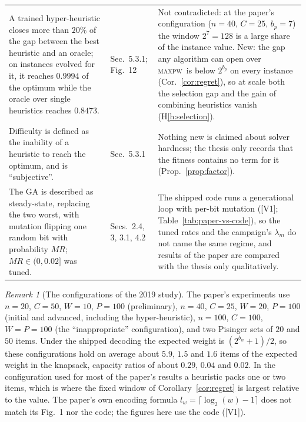 \documentclass[a4paper,11pt]{article}
\newcommand{\bw}{b_{w}}
\newcommand{\bp}{b_{p}}
\newcommand{\MAXPW}{\textsc{maxpw}}
\newcommand{\evid}[1]{\textcolor{inkSoft}{\scriptsize[#1]}}
\theoremstyle{plain}
\theoremstyle{definition}
\theoremstyle{remark}
\newtheorem{remark}{Remark}
\begin{document}
\begin{center}
\begin{longtable}{@{}p{5.3cm}p{1.5cm}p{7.6cm}@{}}
A trained hyper-heuristic closes more than $20\%$ of the gap between the best heuristic and an oracle; on instances evolved for it, it reaches $0.9994$ of the optimum while the oracle over single heuristics reaches $0.8473$. & Sec.~5.3.1; Fig.~12 & Not contradicted: at the paper's configuration ($n=40$, $C=25$, $\bp=7$) the window $2^{7}=128$ is a large share of the instance value. New: the gap any algorithm can open over \MAXPW\ is below $2^{\bp}$ on every instance (Cor.~\ref{cor:regret}), so at scale both the selection gap and the gain of combining heuristics vanish (H\ref{h:selection}). \\
Difficulty is defined as the inability of a heuristic to reach the optimum, and is ``subjective''. & Sec.~5.3.1 & Nothing new is claimed about solver hardness; the thesis only records that the fitness contains no term for it (Prop.~\ref{prop:factor}). \\
The GA is described as steady-state, replacing the two worst, with mutation flipping one random bit with probability $MR$; $MR\in(0,0.02]$ was tuned. & Secs.~2.4, 3, 3.1, 4.2 & The shipped code runs a generational loop with per-bit mutation (\evid{V1}; Table~\ref{tab:paper-vs-code}), so the tuned rates and the campaign's $\lambda_m$ do not name the same regime, and results of the paper are compared with the thesis only qualitatively. \\
\bottomrule
\end{longtable}
\end{center}

\begin{remark}[The configurations of the 2019 study]\label{rem:paperconfigs}
The paper's experiments use $n=20$, $C=50$, $W=10$, $P=100$ (preliminary), $n=40$, $C=25$,
$W=20$, $P=100$ (initial and advanced, including the hyper-heuristic), $n=100$, $C=100$,
$W=P=100$ (the ``inappropriate'' configuration), and two Pisinger sets of $20$ and $50$
items. Under the shipped decoding the expected weight is $(2^{\bw}+1)/2$, so these
configurations hold on average about $5.9$, $1.5$ and $1.6$ items of the expected weight in
the knapsack, capacity ratios of about $0.29$, $0.04$ and $0.02$. In the configuration
used for most of the paper's results a heuristic packs one or two items, which is where
the fixed window of Corollary~\ref{cor:regret} is largest relative to the value. The paper's
own encoding formula $l_w=\lceil\log_2(w)-1\rceil$ does not match its Fig.~1 nor the code;
the figures here use the code (\evid{V1}).
\end{remark}
\end{document}
